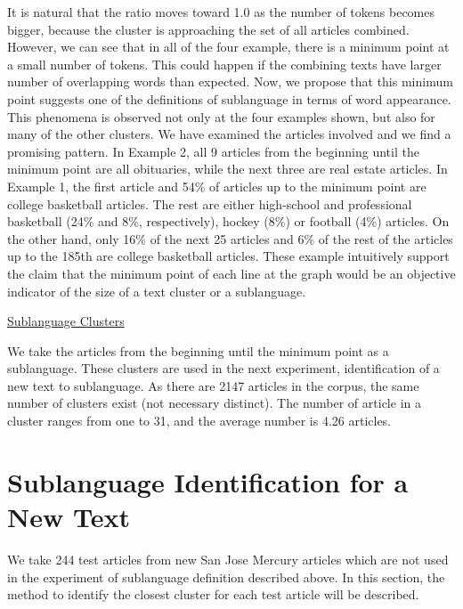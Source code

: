 It is natural that the ratio moves toward 1.0 as the number of tokens becomes bigger, 
because the cluster is approaching the set of all articles combined.
However, we can see that in all of the four example,
there is a minimum point at a small number of tokens.
This could happen if the combining texts have larger number of 
overlapping words than expected.
Now, we propose that this minimum point suggests one of the definitions of
sublanguage in terms of word appearance.
This phenomena is observed not only at the four examples shown, 
but also for many of the other clusters.
We have examined the articles involved and we find a promising pattern.
In Example 2, all 9 articles from the beginning until the minimum point
are all obituaries, while the next three are real estate articles.
In Example 1, the first article and 54\% of articles up to the minimum point are
college basketball articles.
The rest are either high-school and professional basketball (24\% and 8\%, respectively),
hockey (8\%) or football (4\%) articles.
On the other hand, only 16\% of the next 25 articles and
6\% of the rest of the articles up to the 185th are college basketball articles.
These example intuitively support the claim that
the minimum point of each line at the graph would be
an objective indicator of the size of a text cluster or a sublanguage.

\begin{flushleft}
\underline{Sublanguage Clusters} \\
\end{flushleft}

We take the articles from the beginning until the minimum point as a sublanguage. 
These clusters are used in the next experiment, identification of a new text
to sublanguage.
As there are 2147 articles in the corpus, the same number of clusters exist
(not necessary distinct).
The number of article in a cluster ranges from one to 31, 
and the average number is 4.26 articles.


\section{Sublanguage Identification for a New Text}

We take 244 test articles from new San Jose Mercury articles
which are not used in the experiment of sublanguage definition described above.
In this section, the method to identify the closest cluster
for each test article will be described.


